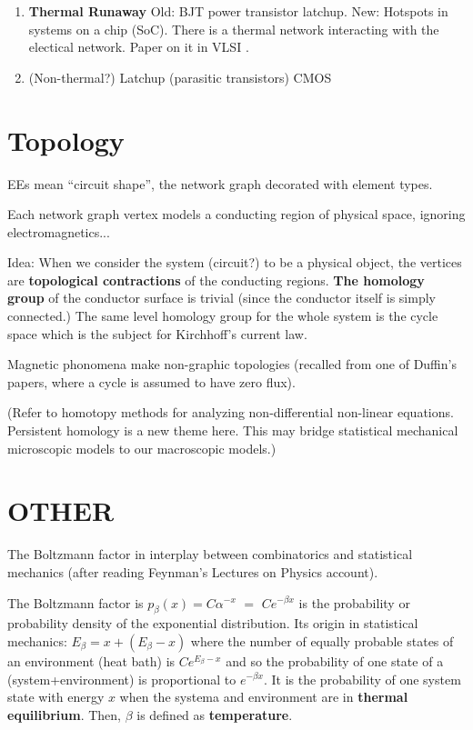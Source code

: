 \documentclass{article}
\begin{document}
\begin{enumerate}
\item
\textbf{Thermal Runaway} Old: BJT power transistor latchup.  New: Hotspots 
in systems on a chip (SoC). There is a thermal network interacting with the 
electical network. Paper on it in VLSI \cite{ThermalVLSI}.

\item (Non-thermal?) Latchup (parasitic transistors) 
CMOS\cite{CMOSLatchUpTINote}

\end{enumerate}

\section{Topology}

EEs mean ``circuit shape'', the network graph decorated with 
element types.

Each network graph vertex models a conducting region of physical space, 
ignoring electromagnetics...

Idea: When we consider the system (circuit?) to be a physical object, the 
vertices are \textbf{topological contractions} of the conducting regions.
\textbf{The homology group} of the conductor surface is trivial (since the
conductor itself is simply connected.)   The same level homology group for 
the whole system is the cycle space which is the subject for Kirchhoff's 
current law.

Magnetic phonomena make non-graphic topologies (recalled from one of 
Duffin's papers, where a cycle is assumed to have zero flux).

(Refer to homotopy methods for analyzing non-differential non-linear 
equations.  Persistent homology is a new theme here.  This may bridge
statistical mechanical microscopic models to our macroscopic models.)

\section{OTHER}

The Boltzmann factor in interplay between combinatorics and statistical
mechanics (after reading Feynman's Lectures on Physics account).

The Boltzmann factor is 
$p_{\beta}(x)= C\alpha^{-x}$ $=$ $Ce^{-\beta x}$ is the probability 
or probability density of the exponential distribution.
Its origin in statistical mechanics:  $E_\beta = x + (E_\beta-x)$ where the 
number of equally probable states of an environment (heat bath) 
is $Ce^{E_\beta - x}$ and so the probability of one state of a 
(system+environment) is proportional to $e^{-\beta x}$.  It is the probability
of one system state with energy $x$ when the systema and environment are
in \textbf{thermal equilibrium}.  Then, $\beta$ is defined as 
\textbf{temperature}.
\end{document}
